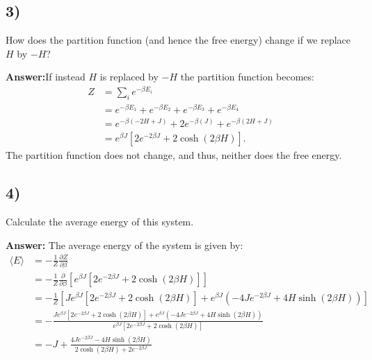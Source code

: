 \documentclass[a4paper]{article}
\newcommand{\newparagraph}{\vspace{.5cm}\noindent}
\newcommand{\average}[1]{\langle #1 \rangle}
\begin{document}
\subsection*{3)}
How does the partition function (and hence the free energy) change if we replace $H$ by $-H$?

\newparagraph
\textbf{Answer:}If instead $H$ is replaced by $-H$ the partition function becomes:
\begin{align*}
    Z &= \sum_i e^{-\beta E_i}\\
    &=e^{-\beta E_1} + e^{-\beta E_2} + e^{-\beta E_3} + e^{-\beta E_4}\\
    &= e^{-\beta (-2H + J)} + 2e^{-\beta (J)} + e^{-\beta (2H + J)}\\
    &= e^{\beta J}\left[2e^{-2\beta J} + 2\cosh(2\beta H)\right].
\end{align*}The partition function does not change, and thus, neither does the free energy.

\subsection*{4)}
Calculate the average energy of this system.

\newparagraph
\textbf{Answer:} The average energy of the system is given by:
\begin{align*}
    \average{E} &= -\frac{1}{Z}\frac{\partial Z}{\partial \beta}\\
    &= -\frac{1}{Z}\frac{\partial}{\partial \beta}\left[e^{\beta J}\left[2e^{-2\beta J} + 2\cosh(2\beta H)\right]\right]\\
    &= -\frac{1}{Z}\left[Je^{\beta J}\left[2e^{-2\beta J} + 2\cosh(2\beta H)\right] + e^{\beta J}\left(-4Je^{-2\beta J} +4H\sinh(2\beta H)\right)\right]\\
    &= -\frac{Je^{\beta J}\left[2e^{-2\beta J} + 2\cosh(2\beta H)\right] + e^{\beta J}\left(-4Je^{-2\beta J} +4H\sinh(2\beta H)\right)}{e^{\beta J}\left[2e^{-2\beta J} + 2\cosh(2\beta H)\right]}\\
    &= -J + \frac{4Je^{-2\beta J} - 4H\sinh(2\beta H)}{2\cosh(2\beta H) + 2e^{-2\beta J}}
\end{align*}
\begin{comment}
\begin{align*}
    \average{E} &= \frac{1}{Z}\frac{\partial Z}{\partial \beta}\\
    &= -\frac{1}{Z}\frac{\partial}{\partial \beta}\left[e^{\beta J}\left[2 + 2\cosh(2\beta H)\right]\right]\\
    &= -\frac{1}{Z}\left[e^{\beta J}J\left[2 + 2\cosh(2\beta H)\right] + e^{\beta J}\left[4H\sinh(2\beta H)\right]\right]\\
    &= -\frac{1}{Z}e^{\beta J}\left[J\left[2 + 2\cosh(2\beta H)\right] + \left[4H\sinh(2\beta H)\right]\right]\\
    &= -\frac{J\left(2 + 2\cosh(2\beta H)\right) + 4H\sinh(2\beta H)}{2 + 2\cosh(2\beta H)}\\
    &=  -\left[J+ 2H\tanh(\beta H)\right]
\end{align*}
\end{comment}
\end{document}
